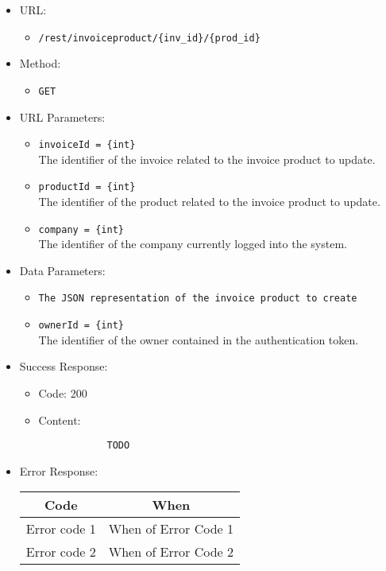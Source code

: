 \begin{itemize}
    
    \item URL: 
    \begin{itemize}
        \item \texttt{/rest/invoiceproduct/\{inv\_id\}/\{prod\_id\}}
    \end{itemize}
    
    \item Method: 
    \begin{itemize}
        \item \texttt{GET}
    \end{itemize}
    
    \item URL Parameters: 
    \begin{itemize}
        \item \texttt{invoiceId = \{int\}} \\
        The identifier of the invoice related to the invoice product to update.
	\item \texttt{productId = \{int\}} \\
        The identifier of the product related to the invoice product to update.
        \item \texttt{company = \{int\}} \\
        The identifier of the company currently logged into the system.
    \end{itemize}
    
    \item Data Parameters: 
    \begin{itemize}
	\item \texttt{The JSON representation of the invoice product to create}
        \item \texttt{ownerId = \{int\}} \\
        The identifier of the owner contained in the authentication token.
    \end{itemize}
    
    \item Success Response: 
    \begin{itemize}
        \item Code: 200
        \item Content:
        \begin{lstlisting}
            TODO
        \end{lstlisting}    
    \end{itemize}
    
    \item Error Response:
    \begin{table}[!h]
    \centering 
    \begin{tabular}{|c|c|}
    \hline
    \multicolumn{1}{|c|}{\textbf{Code}} & \multicolumn{1}{c|}{\textbf{When}} \\ \hline
    Error code 1 & When of Error Code 1 \\\hline
    Error code 2 & When of Error Code 2 \\\hline
    \end{tabular} 
    \end{table} 
    
\end{itemize}
